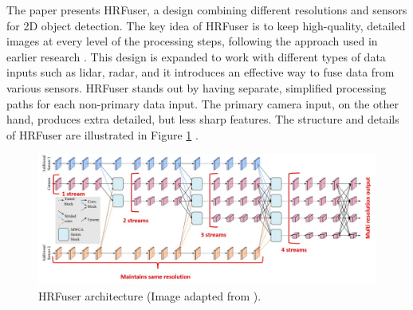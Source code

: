 \documentclass[report.tex]{subfiles}
\begin{document}

    The paper presents HRFuser, a design combining different resolutions and sensors for 2D object detection. The key idea of HRFuser is to keep high-quality, detailed images at every level of the processing steps, following the approach used in earlier research \cite{wang2020hrnet} \cite{yuan2021hrformer}. This design is expanded to work with different types of data inputs such as lidar, radar, and it introduces an effective way to fuse data from various sensors. HRFuser stands out by having separate, simplified processing paths for each non-primary data input. The primary camera input, on the other hand, produces extra detailed, but less sharp features. The structure and details of HRFuser are illustrated in Figure \ref{fig:hrfuser_architecture} \cite{broedermann2022hrfuser}.

    \begin{figure}[h]
        \centering
        \includegraphics[width=1.0\textwidth]{images/methods/hrfuser/architecture_annotated.png}
        \caption{HRFuser architecture (Image adapted from \cite{broedermann2022hrfuser}).}
        \label{fig:hrfuser_architecture}
    \end{figure}
\end{document}

